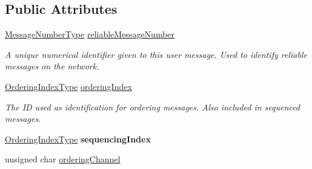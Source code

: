 \subsection*{Public Attributes}
\begin{DoxyCompactItemize}
\item 
\hypertarget{struct_rak_net_1_1_internal_packet_fixed_size_transmission_header_a1c43e5bdc29e63038d48e189a6000508}{\hyperlink{namespace_rak_net_a48a622d2efad1d8be8e1fbc5e8e433db}{Message\-Number\-Type} \hyperlink{struct_rak_net_1_1_internal_packet_fixed_size_transmission_header_a1c43e5bdc29e63038d48e189a6000508}{reliable\-Message\-Number}}\label{struct_rak_net_1_1_internal_packet_fixed_size_transmission_header_a1c43e5bdc29e63038d48e189a6000508}

\begin{DoxyCompactList}\small\item\em A unique numerical identifier given to this user message. Used to identify reliable messages on the network. \end{DoxyCompactList}\item 
\hypertarget{struct_rak_net_1_1_internal_packet_fixed_size_transmission_header_a3741b8ff0dddb2b7bf3158d61a4f1901}{\hyperlink{namespace_rak_net_a2420990844ae2bee638d55b6834baa75}{Ordering\-Index\-Type} \hyperlink{struct_rak_net_1_1_internal_packet_fixed_size_transmission_header_a3741b8ff0dddb2b7bf3158d61a4f1901}{ordering\-Index}}\label{struct_rak_net_1_1_internal_packet_fixed_size_transmission_header_a3741b8ff0dddb2b7bf3158d61a4f1901}

\begin{DoxyCompactList}\small\item\em The I\-D used as identification for ordering messages. Also included in sequenced messages. \end{DoxyCompactList}\item 
\hypertarget{struct_rak_net_1_1_internal_packet_fixed_size_transmission_header_a0d35cefcdac1d34e57d432ef179469e2}{\hyperlink{namespace_rak_net_a2420990844ae2bee638d55b6834baa75}{Ordering\-Index\-Type} {\bfseries sequencing\-Index}}\label{struct_rak_net_1_1_internal_packet_fixed_size_transmission_header_a0d35cefcdac1d34e57d432ef179469e2}

\item 
\hypertarget{struct_rak_net_1_1_internal_packet_fixed_size_transmission_header_a331d964cb7a92b734c82471e5ad4a509}{unsigned char \hyperlink{struct_rak_net_1_1_internal_packet_fixed_size_transmission_header_a331d964cb7a92b734c82471e5ad4a509}{ordering\-Channel}}\label{struct_rak_net_1_1_internal_packet_fixed_size_transmission_header_a331d964cb7a92b734c82471e5ad4a509}


\end{DoxyCompactItemize}
